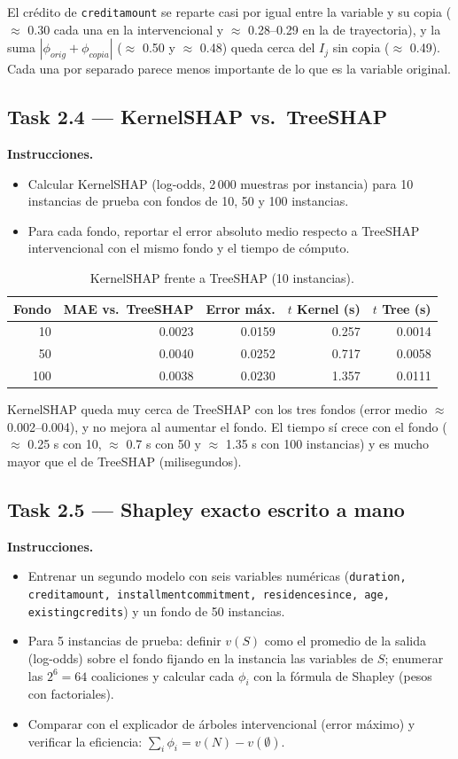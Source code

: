 \documentclass[11pt]{article}
\renewcommand{\_}{\textunderscore\allowbreak{}}
\begin{document}
El crédito de \texttt{credit\_amount} se reparte casi por igual entre la variable y su copia (\(\approx\) 0.30 cada una en la intervencional y \(\approx\) 0.28--0.29 en la de trayectoria), y la suma \(|\phi_{orig}+\phi_{copia}|\) (\(\approx\) 0.50 y \(\approx\) 0.48) queda cerca del \(I_j\) sin copia (\(\approx\) 0.49). Cada una por separado parece menos importante de lo que es la variable original.


\subsection*{Task 2.4 --- KernelSHAP vs.\ TreeSHAP}
\textbf{Instrucciones.}
\begin{itemize}
  \item Calcular KernelSHAP (log-odds, 2\,000 muestras por instancia) para 10 instancias de prueba con fondos de 10, 50 y 100 instancias.
  \item Para cada fondo, reportar el error absoluto medio respecto a TreeSHAP intervencional con el mismo fondo y el tiempo de cómputo.
\end{itemize}

\begin{table}[H]
\centering
\small
\begin{tabular}{rrrrr}
\toprule
Fondo & MAE vs.\ TreeSHAP & Error máx. & $t$ Kernel (s) & $t$ Tree (s) \\
\midrule
10 & 0.0023 & 0.0159 & 0.257 & 0.0014 \\
50 & 0.0040 & 0.0252 & 0.717 & 0.0058 \\
100 & 0.0038 & 0.0230 & 1.357 & 0.0111 \\
\bottomrule
\end{tabular}
\caption{KernelSHAP frente a TreeSHAP (10 instancias).}
\end{table}

KernelSHAP queda muy cerca de TreeSHAP con los tres fondos (error medio \(\approx\) 0.002--0.004), y no mejora al aumentar el fondo. El tiempo sí crece con el fondo (\(\approx\) 0.25 s con 10, \(\approx\) 0.7 s con 50 y \(\approx\) 1.35 s con 100 instancias) y es mucho mayor que el de TreeSHAP (milisegundos).


\subsection*{Task 2.5 --- Shapley exacto escrito a mano}
\textbf{Instrucciones.}
\begin{itemize}
  \item Entrenar un segundo modelo con seis variables numéricas (\texttt{duration, credit\_amount, installment\_commitment, residence\_since, age, existing\_credits}) y un fondo de 50 instancias.
  \item Para 5 instancias de prueba: definir $v(S)$ como el promedio de la salida (log-odds) sobre el fondo fijando en la instancia las variables de $S$; enumerar las $2^6=64$ coaliciones y calcular cada $\phi_i$ con la fórmula de Shapley (pesos con factoriales).
  \item Comparar con el explicador de árboles intervencional (error máximo) y verificar la eficiencia: $\sum_i\phi_i=v(N)-v(\emptyset)$.
\end{itemize}
\end{document}
